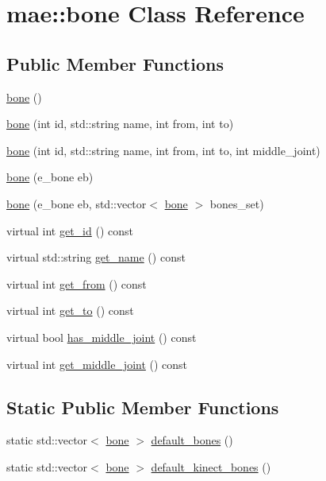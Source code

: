 \hypertarget{classmae_1_1bone}{\section{mae\-:\-:bone Class Reference}
\label{classmae_1_1bone}
}
\subsection*{Public Member Functions}
\begin{DoxyCompactItemize}
\item 
\hyperlink{classmae_1_1bone_a14db84db76d3e63c5c79c9dfa9d1cef0}{bone} ()
\item 
\hyperlink{classmae_1_1bone_a561ff970028f3663ae9cf4fbba7adcd6}{bone} (int id, std\-::string name, int from, int to)
\item 
\hyperlink{classmae_1_1bone_af18795cbd5a5394b5317d7e4a8878ef3}{bone} (int id, std\-::string name, int from, int to, int middle\-\_\-joint)
\item 
\hyperlink{classmae_1_1bone_a53ddd0ed2b97fb1d1263882b4b4ad432}{bone} (e\-\_\-bone eb)
\item 
\hyperlink{classmae_1_1bone_a75ca635a0d3f627a1bbe5a3f1faf019a}{bone} (e\-\_\-bone eb, std\-::vector$<$ \hyperlink{classmae_1_1bone}{bone} $>$ bones\-\_\-set)
\item 
virtual int \hyperlink{classmae_1_1bone_a5d2e2393dd57957ff28d29697bea0249}{get\-\_\-id} () const 
\item 
virtual std\-::string \hyperlink{classmae_1_1bone_aae7a08cddc8003110683412673208983}{get\-\_\-name} () const 
\item 
virtual int \hyperlink{classmae_1_1bone_ab67f78b8888f6a93fafcf90184189f86}{get\-\_\-from} () const 
\item 
virtual int \hyperlink{classmae_1_1bone_a941a84495e83fd2e03346213cb720caa}{get\-\_\-to} () const 
\item 
virtual bool \hyperlink{classmae_1_1bone_a6352164d54e3eec7cd2a398c33dcca3c}{has\-\_\-middle\-\_\-joint} () const 
\item 
virtual int \hyperlink{classmae_1_1bone_a7f468c1bfe33063c40aed4a2377f7c2b}{get\-\_\-middle\-\_\-joint} () const 
\end{DoxyCompactItemize}
\subsection*{Static Public Member Functions}
\begin{DoxyCompactItemize}
\item 
static std\-::vector$<$ \hyperlink{classmae_1_1bone}{bone} $>$ \hyperlink{classmae_1_1bone_a2d1dc38188f1eced8fdcfd787337286f}{default\-\_\-bones} ()
\item 
static std\-::vector$<$ \hyperlink{classmae_1_1bone}{bone} $>$ \hyperlink{classmae_1_1bone_a3f5e6886baa869e257702be6e8e35317}{default\-\_\-kinect\-\_\-bones} ()
\end{DoxyCompactItemize}
